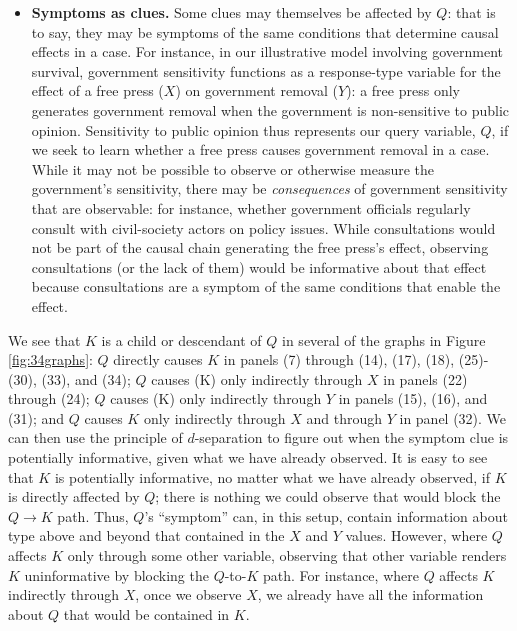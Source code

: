 \documentclass[
  12pt,
]{book}
\providecommand{\tightlist}{%
  \setlength{\itemsep}{0pt}\setlength{\parskip}{0pt}}
\begin{document}
\begin{itemize}
\tightlist
\item
  \textbf{Symptoms as clues.} Some clues may themselves be affected by \(Q\): that is to say, they may be symptoms of the same conditions that determine causal effects in a case. For instance, in our illustrative model involving government survival, government sensitivity functions as a response-type variable for the effect of a free press (\(X\)) on government removal (\(Y\)): a free press only generates government removal when the government is non-sensitive to public opinion. Sensitivity to public opinion thus represents our query variable, \(Q\), if we seek to learn whether a free press causes government removal in a case. While it may not be possible to observe or otherwise measure the government's sensitivity, there may be \emph{consequences} of government sensitivity that are observable: for instance, whether government officials regularly consult with civil-society actors on policy issues. While consultations would not be part of the causal chain generating the free press's effect, observing consultations (or the lack of them) would be informative about that effect because consultations are a symptom of the same conditions that enable the effect.
\end{itemize}

We see that \(K\) is a child or descendant of \(Q\) in several of the graphs in Figure \ref{fig:34graphs}: \(Q\) directly causes \(K\) in panels (7) through (14), (17), (18), (25)-(30), (33), and (34); \(Q\) causes (K) only indirectly through \(X\) in panels (22) through (24); \(Q\) causes (K) only indirectly through \(Y\) in panels (15), (16), and (31); and \(Q\) causes \(K\) only indirectly through \(X\) and through \(Y\) in panel (32). We can then use the principle of \(d\)-separation to figure out when the symptom clue is potentially informative, given what we have already observed. It is easy to see that \(K\) is potentially informative, no matter what we have already observed, if \(K\) is directly affected by \(Q\); there is nothing we could observe that would block the \(Q \rightarrow K\) path. Thus, \(Q\)'s ``symptom'' can, in this setup, contain information about type above and beyond that contained in the \(X\) and \(Y\) values. However, where \(Q\) affects \(K\) only through some other variable, observing that other variable renders \(K\) uninformative by blocking the \(Q\)-to-\(K\) path. For instance, where \(Q\) affects \(K\) indirectly through \(X\), once we observe \(X\), we already have all the information about \(Q\) that would be contained in \(K\).
\end{document}
